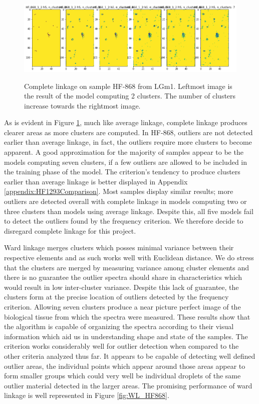 \begin{figure}[H]

    \centering
{\includegraphics[width=13cm]{images/Complete_linkage/LGm-1/HF-868_1_2.h5_0.png} }
\caption{Complete linkage on sample HF-868 from LGm1. Leftmost image is the result of the model computing 2 clusters. The number of clusters increase towards the rightmost image.\label{fig:CL_HF868}}%

\end{figure}

As is evident in Figure \ref{fig:CL_HF868}, much like average linkage, complete linkage produces clearer areas as more clusters are computed. In HF-868, outliers are not detected earlier than average linkage, in fact, the outliers require more clusters to become apparent. A good approximation for the majority of samples appear to be the models computing seven clusters, if a few outliers are allowed to be included in the training phase of the model. The criterion's tendency to produce clusters earlier than average linkage is better displayed in Appendix \ref{appendix:HF1293Comparison}. Most samples display similar results; more outliers are detected overall with complete linkage in models computing two or three clusters than models using average linkage. Despite this, all five models fail to detect the outliers found by the frequency criterion. We therefore decide to disregard complete linkage for this project.

Ward linkage merges clusters which posses minimal variance between their respective elements and as such works well with Euclidean distance. We do stress that the clusters are merged by measuring variance among cluster elements and there is no guarantee the outlier spectra should share in characteristics which would result in low inter-cluster variance. Despite this lack of guarantee, the clusters form at the precise location of outliers detected by the frequency criterion. Allowing seven clusters produce a near picture perfect image of the biological tissue from which the spectra were measured. These results show that the algorithm is capable of organizing the spectra according to their visual information which aid us in understanding shape and state of the samples. The criterion works considerably well for outlier detection when compared to the other criteria analyzed thus far. It appears to be capable of detecting well defined outlier areas, the individual points which appear around those areas appear to form smaller groups which could very well be individual droplets of the same outlier material detected in the larger areas. The promising performance of ward linkage is well represented in Figure \ref{fig:WL_HF868}.

